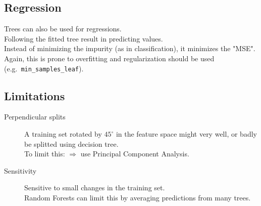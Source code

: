 \subsection{Regression}
Trees can also be used for regressions.\\
Following the fitted tree result in predicting values.\\
Instead of minimizing the impurity (as in classification), it minimizes the "MSE".\\
Again, this is prone to overfitting and regularization should be used (e.g.\ \verb;min_samples_leaf;).

\subsection{Limitations}
\begin{description}
    \item [Perpendicular splits] \hfill
    A training set rotated by $45^\circ$ in the feature space might very well, or badly be splitted using decision tree.\\
    To limit this: $\Rightarrow$ use Principal Component Analysis.
    \item [Sensitivity] \hfill
    Sensitive to small changes in the training set.\\
    Random Forests can limit this by averaging predictions from many trees. 
\end{description}
